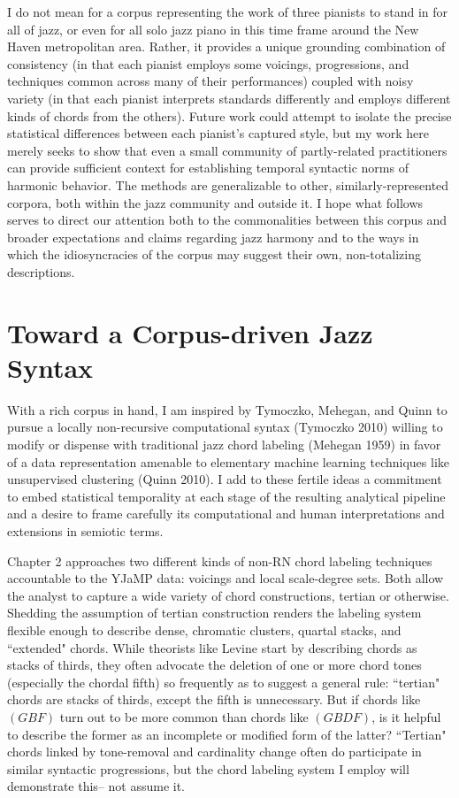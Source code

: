 I do not mean for a corpus representing the work of three pianists to stand in for all of jazz, or even for all solo jazz piano in this time frame around the New Haven metropolitan area.  Rather, it provides a unique grounding combination of consistency (in that each pianist employs some voicings, progressions, and techniques common across many of their performances) coupled with noisy variety (in that each pianist interprets standards differently and employs different kinds of chords from the others).  Future work could attempt to isolate the precise statistical differences between each pianist's captured style, but my work here merely seeks to show that even a small community of partly-related practitioners can provide sufficient context for establishing temporal syntactic norms of harmonic behavior.  The methods are generalizable to other, similarly-represented corpora, both within the jazz community and outside it.  I hope what follows serves to direct our attention both to the commonalities between this corpus and broader expectations and claims regarding jazz harmony and to the ways in which the idiosyncracies of the corpus may suggest their own, non-totalizing descriptions.

\section{Toward a Corpus-driven Jazz Syntax}

With a rich corpus in hand, I am inspired by Tymoczko, Mehegan, and Quinn to pursue a locally non-recursive computational syntax (Tymoczko 2010) willing to modify or dispense with traditional jazz chord labeling (Mehegan 1959) in favor of a data representation amenable to elementary machine learning techniques like unsupervised clustering (Quinn 2010).  I add to these fertile ideas a commitment to embed statistical temporality at each stage of the resulting analytical pipeline and a desire to frame carefully its computational and human interpretations and extensions in semiotic terms.

Chapter 2 approaches two different kinds of non-RN chord labeling techniques accountable to the YJaMP data: voicings and local scale-degree sets.  Both allow the analyst to capture a wide variety of chord constructions, tertian or otherwise.  Shedding the assumption of tertian construction renders the labeling system flexible enough to describe dense, chromatic clusters, quartal stacks, and ``extended" chords.  While theorists like Levine start by describing chords as stacks of thirds, they often advocate the deletion of one or more chord tones (especially the chordal fifth) so frequently as to suggest a general rule: ``tertian" chords are stacks of thirds, except the fifth is unnecessary.  But if chords like $(GBF)$ turn out to be more common than chords like $(GBDF)$, is it helpful to describe the former as an incomplete or modified form of the latter?  ``Tertian" chords linked by tone-removal and cardinality change often do participate in similar syntactic progressions, but the chord labeling system I employ will demonstrate this-- not assume it.

